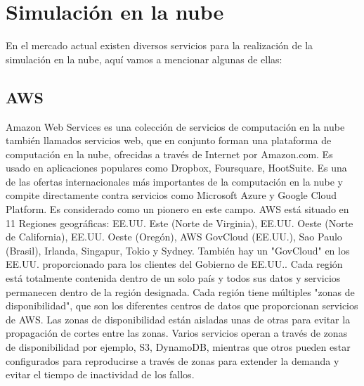 \section{Simulación en la nube}
En el mercado actual existen diversos servicios para la realización de la simulación en la nube, aquí vamos a mencionar algunas de ellas:

\subsection{AWS}
Amazon Web Services es una colección de servicios de computación en la nube también llamados servicios web, que en conjunto forman una plataforma de computación en la nube, ofrecidas a través de Internet por Amazon.com. Es usado en aplicaciones populares como Dropbox, Foursquare, HootSuite. Es una de las ofertas internacionales más importantes de la computación en la nube y compite directamente contra servicios como Microsoft Azure y Google Cloud Platform. Es considerado como un pionero en este campo.
AWS está situado en 11 Regiones geográficas: EE.UU. Este (Norte de Virginia), EE.UU. Oeste (Norte de California), EE.UU. Oeste (Oregón), AWS GovCloud (EE.UU.), Sao Paulo (Brasil), Irlanda, Singapur, Tokio y Sydney. También hay un "GovCloud" en los EE.UU. proporcionado para los clientes del Gobierno de EE.UU.. Cada región está totalmente contenida dentro de un solo país y todos sus datos y servicios permanecen dentro de la región designada.
Cada región tiene múltiples "zonas de disponibilidad", que son los diferentes centros de datos que proporcionan servicios de AWS. Las zonas de disponibilidad están aisladas unas de otras para evitar la propagación de cortes entre las zonas. Varios servicios operan a través de zonas de disponibilidad por ejemplo, S3, DynamoDB, mientras que otros pueden estar configurados para reproducirse a través de zonas para extender la demanda y evitar el tiempo de inactividad de los fallos.

